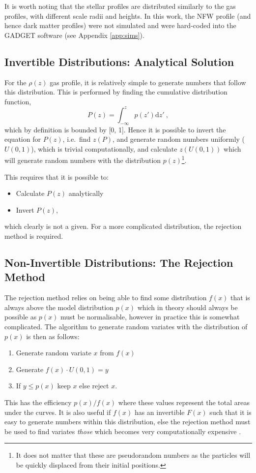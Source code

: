 It is worth noting that the stellar profiles are distributed similarly
to the gas profiles, with different scale radii and heights. In this work, the NFW profile (and hence dark matter profiles) were not simulated and were hard-coded into the GADGET software (see Appendix \ref{app:sims}).

\subsection{Invertible Distributions: Analytical
Solution}\label{easy-distributions---analytical-solution}

For the \(\rho(z)\) gas profile, it is relatively simple to generate
numbers that follow this distribution. This is performed by finding the
cumulative distribution function,
\[
    P(z) = \int_{-\infty}^z p(z') \mathrm{d}z'~,
\]
which by definition is bounded by {[}0, 1{]}. Hence it is possible to invert the
equation for \(P(z)\), i.e.~find \(z(P)\), and generate random numbers
uniformly (\(U(0, 1)\)), which is trivial computationally, and calculate
\(z(U(0, 1))\) which will generate random numbers with the distribution
\(p(z)\)\footnote{It does not matter that these are pseudorandom numbers as the particles will be quickly displaced from their initial positions.}.

This requires that it is possible to:
\begin{itemize}
\item
  Calculate \(P(z)\) analytically
\item
  Invert \(P(z)\),
\end{itemize}
which clearly is not a given. For a more complicated distribution, the
rejection method is required.

\subsection{Non-Invertible Distributions: The Rejection
Method}\label{hard-distributions---the-rejection-method}

The rejection method relies on being able to find some distribution
\(f(x)\) that is always above the model distribution \(p(x)\) which in theory
should always be possible as \(p(x)\) must be normalisable, however
in practice this is somewhat complicated. The algorithm to generate
random variates with the distribution of \(p(x)\) is then as follows:

\begin{enumerate}
\item
  Generate random variate \(x\) from \(f(x)\)
\item
  Generate \(f(x) \cdot U(0, 1) = y\)
\item
  If \(y \leq p(x)\) keep \(x\) else reject \(x\).
\end{enumerate}

This has the efficiency \(p(x)/f(x)\) where these values represent the
total areas under the curves. It is also useful if \(f(x)\) has an
invertible \(F(x)\) such that it is easy to generate numbers within this
distribution, else the rejection method must be used to find variates
\emph{those} which becomes very computationally expensive \citep{press_numerical_2007}.

